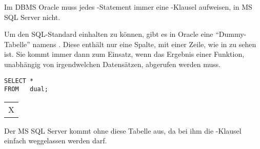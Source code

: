 \begin{merke}
    Im DBMS Oracle muss jedes \SELECT-Statement immer eine \FROM-Klausel
    aufweisen, in MS SQL Server nicht.
\end{merke}
Um den SQL-Standard einhalten zu können, gibt es in Oracle eine \enquote{Dummy-Tabelle} namens . Diese enthält nur eine 		 Spalte, mit einer Zeile, wie in  zu sehen ist. Sie kommt immer dann zum Einsatz, wenn das Ergebnis einer Funktion, unabhängig von irgendwelchen Datensätzen, abgerufen werden muss.
\begin{lstlisting}[language=oracle_sql,caption={Die Tabelle \identifier{dual} in Oracle},label=sql03_14]
SELECT *
FROM   dual;
        \end{lstlisting}
\begin{center}
    \begin{small}
        \tablehead{}
        \begin{oraclesql}
            \begin{supertabular}{l}
                X \\
            \end{supertabular}
        \end{oraclesql}
    \end{small}
\end{center}
Der MS SQL Server kommt ohne diese Tabelle aus, da bei ihm die
\FROM-Klausel einfach weggelassen werden darf.
